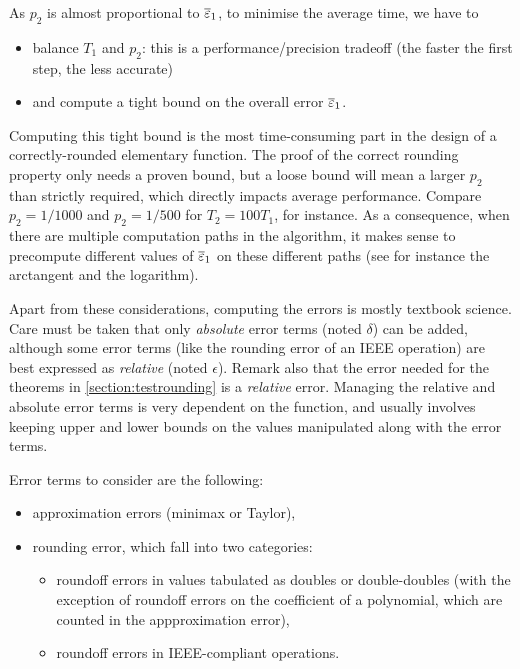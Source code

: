 As $p_2$ is almost proportional to ${\overline{\varepsilon}}_1$, to minimise the average
time, we have to
\begin{itemize}
\item balance $T_1$ and $p_2$: this is a performance/precision
  tradeoff (the faster the first step, the less accurate)
\item and compute a tight bound on the overall error  ${\overline{\varepsilon}}_1$.
\end{itemize}

Computing this tight bound is the most time-consuming part in the
design of a correctly-rounded elementary function. The proof of the
correct rounding property only needs a proven bound, but a loose bound
will mean a larger $p_2$ than strictly required, which directly
impacts average performance. Compare $p_2=1/1000$ and $p_2=1/500$ for
$T_2=100T_1$, for instance. As a consequence, when there are multiple
computation paths in the algorithm, it makes sense to precompute
different values of ${\overline{\varepsilon}}_1$ on these different paths (see for
instance the arctangent and the logarithm).






Apart from these considerations, computing the errors is mostly
textbook science. Care must be taken that only \emph{absolute} error
terms (noted $\delta$) can be added, although some error terms (like
the rounding error of an IEEE operation) are best expressed as
\emph{relative} (noted $\epsilon$). Remark also that the error needed
for the theorems in \ref{section:testrounding} is a \emph{relative}
error.  Managing the relative and absolute error terms is very
dependent on the function, and usually involves keeping upper and
lower bounds on the values manipulated along with the error terms.

Error terms to consider are the following:
\begin{itemize}
\item approximation errors  (minimax or Taylor),
\item rounding error, which fall into two categories:
  \begin{itemize}
  \item roundoff errors in values tabulated as doubles or
    double-doubles (with the exception of roundoff errors on the coefficient
    of a polynomial, which are counted in the appproximation error),
  \item roundoff errors in IEEE-compliant operations.
  \end{itemize}
\end{itemize}



